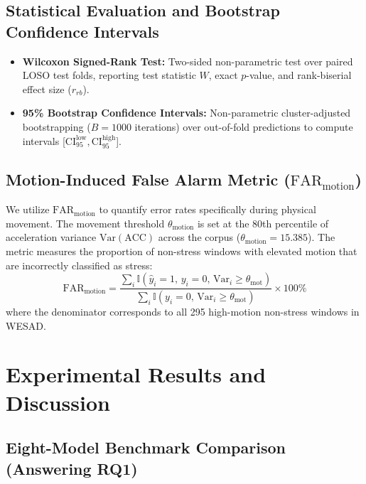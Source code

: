 \documentclass[conference]{IEEEtran}
\begin{document}
\subsection{Statistical Evaluation and Bootstrap Confidence Intervals}
\begin{itemize}
    \item \textbf{Wilcoxon Signed-Rank Test:} Two-sided non-parametric test over paired LOSO test folds, reporting test statistic $W$, exact $p$-value, and rank-biserial effect size ($r_{rb}$).
    \item \textbf{95\% Bootstrap Confidence Intervals:} Non-parametric cluster-adjusted bootstrapping ($B = 1000$ iterations) over out-of-fold predictions to compute intervals [$\text{CI}_{95}^{\text{low}}, \text{CI}_{95}^{\text{high}}$].
\end{itemize}

\subsection{Motion-Induced False Alarm Metric \texorpdfstring{($\text{FAR}_{\text{motion}}$)}{(FAR-motion)}}
We utilize $\text{FAR}_{\text{motion}}$ to quantify error rates specifically during physical movement. The movement threshold $\theta_{\text{motion}}$ is set at the 80th percentile of acceleration variance $\text{Var}(\text{ACC})$ across the corpus ($\theta_{\text{motion}} = 15.385$). The metric measures the proportion of non-stress windows with elevated motion that are incorrectly classified as stress:
\begin{equation}
\text{FAR}_{\text{motion}} = \frac{\sum_{i} \mathbb{I}(\hat{y}_i = 1,\, y_i = 0,\, \text{Var}_i \ge \theta_{\text{mot}})}{\sum_{i} \mathbb{I}(y_i = 0,\, \text{Var}_i \ge \theta_{\text{mot}})} \times 100\%
\end{equation}
where the denominator corresponds to all 295 high-motion non-stress windows in WESAD.

\section{Experimental Results and Discussion}

\subsection{Eight-Model Benchmark Comparison (Answering RQ1)}
\end{document}
